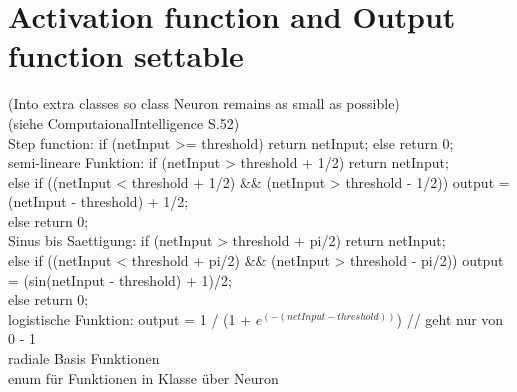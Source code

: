\section{Activation function and Output function settable}
(Into extra classes so class Neuron remains as small as possible)\\
(siehe ComputaionalIntelligence S.52)\\
Step function:	if (netInput >= threshold) return netInput; else return 0;\\
semi-lineare Funktion: if (netInput > threshold + 1/2) return netInput;\\
else if ((netInput < threshold + 1/2) \&\& (netInput > threshold - 1/2)) output = (netInput - threshold) + 1/2;\\
else return 0;\\
Sinus bis Saettigung: if (netInput > threshold + pi/2) return netInput;\\
else if ((netInput < threshold + pi/2) \&\& (netInput > threshold - pi/2)) output = (sin(netInput - threshold) + 1)/2;\\
else return 0;\\
logistische Funktion: output = 1 / (1 + $e^{(-(netInput - threshold))}$) // geht nur von 0 - 1\\
radiale Basis Funktionen\\
enum für Funktionen in Klasse über Neuron